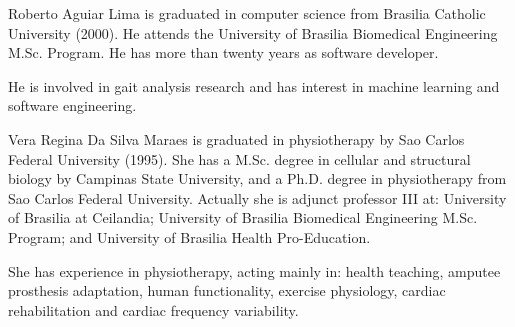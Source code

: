 \documentclass[journal]{IEEEtran}
\begin{document}


% 

\begin{IEEEbiography}{Roberto Aguiar Lima}
	is graduated in computer science from Brasilia Catholic University (2000).
	He attends the University of Brasilia Biomedical Engineering M.Sc. Program.
	He has more than twenty years as software developer.

	He is involved in gait analysis research and has interest in machine learning and software engineering.
\end{IEEEbiography}

\begin{IEEEbiography}{Vera Regina Da Silva Maraes}
	is graduated in physiotherapy by Sao Carlos Federal University (1995). She has a M.Sc. degree in 
	cellular and structural biology by Campinas State University, and a Ph.D. degree in physiotherapy
	from Sao Carlos Federal University. 
	Actually she is  adjunct professor III at: University of Brasilia at Ceilandia; 
	University of Brasilia Biomedical Engineering M.Sc. Program;
	and University of Brasilia Health Pro-Education.

	She has experience in physiotherapy, acting mainly in: health teaching, amputee prosthesis adaptation,
	human functionality, exercise physiology, cardiac rehabilitation and cardiac frequency variability.
\end{IEEEbiography}
\end{document}
